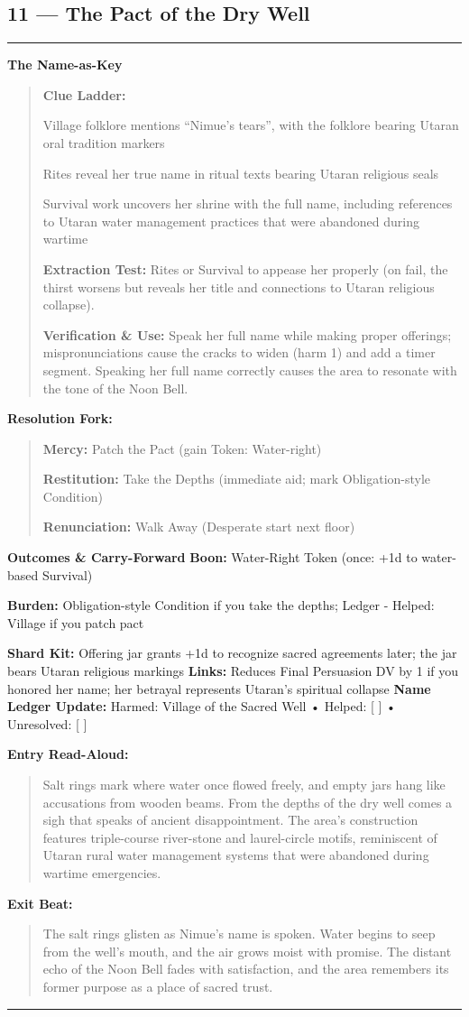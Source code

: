 \documentclass[18pt, letterpaper, twoside]{article}
\newenvironment{floorbox}[1]{%
    \begin{center}
    \begin{minipage}{0.95\textwidth}
    \subsection*{#1}
    \vspace{-0.5em}
    \rule{\textwidth}{0.5pt}
    \vspace{0.5em}
}{%
    \vspace{0.5em}
    \rule{\textwidth}{0.5pt}
    \end{minipage}
    \end{center}
}
\newenvironment{gmnote}[1]{%
    \vspace{0.5em}
    \noindent\textbf{#1}
    \begin{quote}
}{%
    \end{quote}
    \vspace{0.5em}
}
\newenvironment{resolutionbox}{%
    \vspace{0.5em}
    \noindent\textbf{Resolution Fork:}
    \begin{quote}
}{%
    \end{quote}
    \vspace{0.5em}
}
\newenvironment{boxedtext}[1]{%
    \vspace{0.5em}
    \noindent\textbf{#1}
    \begin{quote}
}{%
    \end{quote}
    \vspace{0.5em}
}
\newcommand{\boon}[1]{\noindent\textbf{Boon:} #1\par}
\newcommand{\burden}[1]{\noindent\textbf{Burden:} #1\par}
\newcommand{\entrytext}[1]{\begin{boxedtext}{Entry Read-Aloud:} #1 \end{boxedtext}}
\newcommand{\exittext}[1]{\begin{boxedtext}{Exit Beat:} #1 \end{boxedtext}}
\begin{document}
\begin{floorbox}{11 --- The Pact of the Dry Well}
\begin{gmnote}{The Name-as-Key}
\textbf{Clue Ladder:}
\begin{description}[leftmargin=*, style=unboxed]
    \item[Gentle Nudge:] Village folklore mentions ``Nimue's tears'', with the folklore bearing Utaran oral tradition markers
    \item[Actionable Lead:] Rites reveal her true name in ritual texts bearing Utaran religious seals
    \item[Aha! Proof:] Survival work uncovers her shrine with the full name, including references to Utaran water management practices that were abandoned during wartime
\end{description}

\textbf{Extraction Test:} Rites or Survival to appease her properly (on fail, the thirst worsens but reveals her title and connections to Utaran religious collapse).

\textbf{Verification \& Use:} Speak her full name while making proper offerings; mispronunciations cause the cracks to widen (harm 1) and add a timer segment. Speaking her full name correctly causes the area to resonate with the tone of the Noon Bell.
\end{gmnote}

\begin{resolutionbox}
\textbf{Mercy:} Patch the Pact (gain Token: Water-right)

\textbf{Restitution:} Take the Depths (immediate aid; mark Obligation-style Condition)

\textbf{Renunciation:} Walk Away (Desperate start next floor)
\end{resolutionbox}

\textbf{Outcomes \& Carry-Forward}
\boon{Water-Right Token (once: +1d to water-based Survival)}
\burden{Obligation-style Condition if you take the depths; Ledger - Helped: Village if you patch pact}
\textbf{Shard Kit:} Offering jar grants +1d to recognize sacred agreements later; the jar bears Utaran religious markings
\textbf{Links:} Reduces Final Persuasion DV by 1 if you honored her name; her betrayal represents Utaran's spiritual collapse
\textbf{Name Ledger Update:} Harmed: Village of the Sacred Well • Helped: [ ] • Unresolved: [ ]

\entrytext{Salt rings mark where water once flowed freely, and empty jars hang like accusations from wooden beams. From the depths of the dry well comes a sigh that speaks of ancient disappointment. The area's construction features triple-course river-stone and laurel-circle motifs, reminiscent of Utaran rural water management systems that were abandoned during wartime emergencies.}

\exittext{The salt rings glisten as Nimue's name is spoken. Water begins to seep from the well's mouth, and the air grows moist with promise. The distant echo of the Noon Bell fades with satisfaction, and the area remembers its former purpose as a place of sacred trust.}
\end{floorbox}
\end{document}
